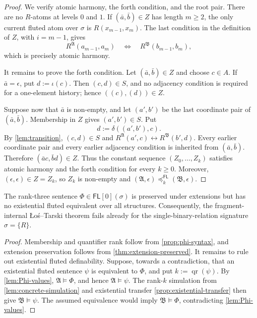 \documentclass{lmcs}
\newcommand{\FL}{\mathsf{FL}}
\newcommand{\qr}{\operatorname{qr}}
\newcommand{\A}{\mathfrak{A}}
\newcommand{\B}{\mathfrak{B}}
\begin{document}
\begin{proof}
We verify atomic harmony, the forth condition, and the root pair.  There are
no $R$-atoms at levels $0$ and $1$.
If $(\bar a,\bar b)\in Z$ has length $m\geq2$, the only current fluted atom
over $\sigma$ is $R(x_{m-1},x_m)$.  The last condition in the definition of
$Z$, with $i=m-1$, gives
\[
  R^{\A}(a_{m-1},a_m)
  \quad\Longleftrightarrow\quad
  R^{\B}(b_{m-1},b_m),
\]
which is precisely atomic harmony.

It remains to prove the forth condition.  Let $(\bar a,\bar b)\in Z$ and choose $c\in A$.
If $\bar a=\epsilon$, put $d:=\iota(c)$.  Then
$(c,d)\in S$, and no adjacency condition is required for a one-element
history; hence $((c),(d))\in Z$.

Suppose now that $\bar a$ is non-empty, and let $(a',b')$ be the last
coordinate pair of $(\bar a,\bar b)$.  Membership in $Z$ gives
$(a',b')\in S$.  Put
\[
  d:=\delta((a',b'),c).
\]
By \cref{lem:transition}, $(c,d)\in S$ and
$R^{\A}(a',c)\leftrightarrow R^{\B}(b',d)$.  Every earlier coordinate pair
and every earlier adjacency condition is inherited from $(\bar a,\bar b)$.
Therefore $(\bar a c,\bar b d)\in Z$.  Thus the constant sequence
$(Z_0,\ldots,Z_k)$ satisfies atomic harmony and the forth condition for every
$k\geq0$.
Moreover, $(\epsilon,\epsilon)\in Z=Z_k$, so $Z_k$ is non-empty and
$(\A,\epsilon)\preccurlyeq_k^{\FL}(\B,\epsilon)$.
\end{proof}

\begin{thm}
\label{thm:los-tarski-failure}
The rank-three sentence \(\Phi\in\FL[0](\sigma)\) is preserved under
extensions but has no existential fluted equivalent over all structures.
Consequently, the fragment-internal \L o\'s--Tarski theorem fails already for
the single-binary-relation signature \(\sigma=\{R\}\).
\end{thm}

\begin{proof}
Membership and quantifier rank follow from \cref{prop:phi-syntax}, and
extension preservation follows from \cref{thm:extension-preserved}.  It
remains to rule out existential fluted definability.  Suppose, towards a
contradiction, that an existential fluted sentence \(\psi\) is equivalent to
\(\Phi\), and put $k:=\qr(\psi)$.  By \cref{lem:Phi-values},
\(\A\models\Phi\), and hence \(\A\models\psi\).  The rank-$k$ simulation
from \cref{lem:concrete-simulation} and existential transfer
\cref{prop:existential-transfer} then give \(\B\models\psi\).  The assumed
equivalence would imply \(\B\models\Phi\), contradicting
\cref{lem:Phi-values}.
\end{proof}
\end{document}
